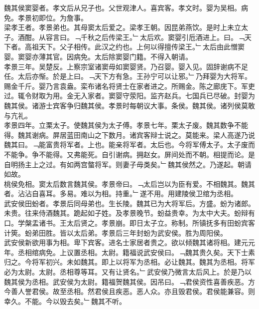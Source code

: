 \documentclass{zhvt-classic}
\begin{document}

\hspace*{2em}魏其侯窦婴者。孝文后从兄子也。父世观津人。喜宾客。孝文时。婴为吴相。病免。孝景初即位。为詹事。\\
\hspace*{2em}梁孝王者。孝景弟也。其母窦太后爱之。梁孝王朝。因昆弟燕饮。是时上未立太子。酒酣。从容言曰。﹁千秋之后传梁王。﹂太后欢。窦婴引卮酒进上。曰。﹁天下者。高祖天下。父子相传。此汉之约也。上何以得擅传梁王。﹂太后由此憎窦婴。窦婴亦薄其官。因病免。太后除窦婴门籍。不得入朝请。\\
\hspace*{2em}孝景三年。吴楚反。上察宗室诸窦毋如窦婴贤。乃召婴。婴入见。固辞谢病不足任。太后亦惭。於是上曰。﹁天下方有急。王孙宁可以让邪。﹂乃拜婴为大将军。赐金千斤。婴乃言袁盎。栾布诸名将贤士在家者进之。所赐金。陈之廊庑下。军吏过。辄令财取为用。金无入家者。窦婴守荥阳。监齐赵兵。七国兵已尽破。封婴为魏其侯。诸游士宾客争归魏其侯。孝景时每朝议大事。条侯。魏其侯。诸列侯莫敢与亢礼。\\
\hspace*{2em}孝景四年。立栗太子。使魏其侯为太子傅。孝景七年。栗太子废。魏其数争不能得。魏其谢病。屏居蓝田南山之下数月。诸宾客辩士说之。莫能来。梁人高遂乃说魏其曰。﹁能富贵将军者。上也。能亲将军者。太后也。今将军傅太子。太子废而不能争。争不能得。又弗能死。自引谢病。拥赵女。屏间处而不朝。相提而论。是自明扬主上之过。有如两宫螫将军。则妻子毋类矣。﹂魏其侯然之。乃遂起。朝请如故。\\
\hspace*{2em}桃侯免相。窦太后数言魏其侯。孝景帝曰。﹁太后岂以为臣有爱。不相魏其。魏其者。沾沾自喜耳。多易。难以为相。持重。﹂遂不用。用建陵侯卫绾为丞相。\\
\hspace*{2em}武安侯田蚡者。孝景后同母弟也。生长陵。魏其已为大将军后。方盛。蚡为诸郎。未贵。往来侍酒魏其。跪起如子姓。及孝景晚节。蚡益贵幸。为太中大夫。蚡辩有口。学槃盂诸书。王太后贤之。孝景崩。即日太子立。称制。所镇抚多有田蚡宾客计筴。蚡弟田胜。皆以太后弟。孝景后三年封蚡为武安侯。胜为周阳侯。\\
\hspace*{2em}武安侯新欲用事为相。卑下宾客。进名士家居者贵之。欲以倾魏其诸将相。建元元年。丞相绾病免。上议置丞相。太尉。籍福说武安侯曰。﹁魏其贵久矣。天下士素归之。今将军初兴。未如魏其。即上以将军为丞相。必让魏其。魏其为丞相。将军必为太尉。太尉。丞相尊等耳。又有让贤名。﹂武安侯乃微言太后风上。於是乃以魏其侯为丞相。武安侯为太尉。籍福贺魏其侯。因吊曰。﹁君侯资性喜善疾恶。方今善人誉君侯。故至丞相。然君侯且疾恶。恶人众。亦且毁君侯。君侯能兼容。则幸久。不能。今以毁去矣。﹂魏其不听。\\
\end{document}
